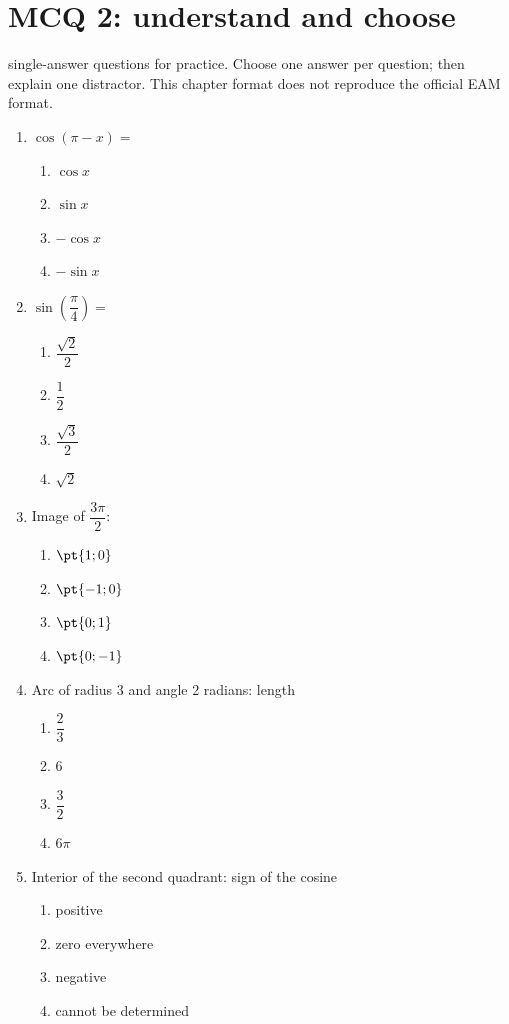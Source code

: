 \endgroup
\begingroup\small
{}\section*{MCQ 2: understand and choose}\label{C10-Q2}
 single-answer questions for practice. Choose one answer per question; then explain one distractor. This chapter format does not reproduce the official EAM format.
\begin{enumerate}
\item $\cos(\pi-x)=$
\begin{enumerate}[label=\Alph*.,itemsep=2pt]
\item $\cos x$
\item $\sin x$
\item $-\cos x$
\item $-\sin x$
\end{enumerate}
\item $\sin (\dfrac{\pi}{4})=$
\begin{enumerate}[label=\Alph*.,itemsep=2pt]
\item $\dfrac{\sqrt 2}{2}$
\item $\dfrac{1}{2}$
\item $\dfrac{\sqrt 3}{2}$
\item $\sqrt2$
\end{enumerate}
\item Image of $\dfrac{3\pi}{2}$:
\begin{enumerate}[label=\Alph*.,itemsep=2pt]
\item $\pt{1;0}$
\item $\pt{-1;0}$
\item $\pt{0;1}$
\item $\pt{0;-1}$
\end{enumerate}
\item Arc of radius 3 and angle 2 radians: length
\begin{enumerate}[label=\Alph*.,itemsep=2pt]
\item $\dfrac{2}{3}$
\item $6$
\item $\dfrac{3}{2}$
\item $6\pi$
\end{enumerate}
\item Interior of the second quadrant: sign of the cosine
\begin{enumerate}[label=\Alph*.,itemsep=2pt]
\item positive
\item zero everywhere
\item negative
\item cannot be determined
\end{enumerate}
\end{enumerate}
